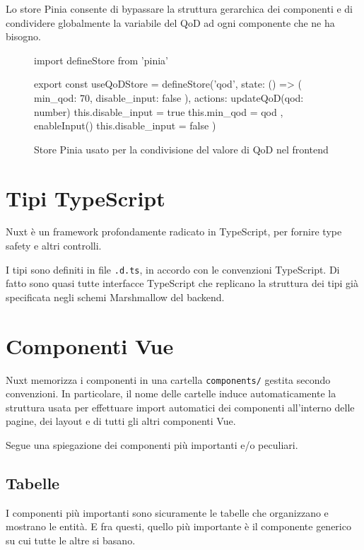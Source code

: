 Lo store Pinia consente di bypassare la struttura gerarchica dei componenti e di condividere globalmente la variabile del QoD ad ogni componente che ne ha bisogno.

\begin{figure}
\centering
\begin{jscode}
import { defineStore } from 'pinia'

export const useQoDStore = defineStore('qod', {
  state: () => ({ min_qod: 70, disable_input: false }),
  actions: {
    updateQoD(qod: number) {
      this.disable_input = true
      this.min_qod = qod
    },
    enableInput() {
      this.disable_input = false
    }
  }
})
\end{jscode}
\caption{Store Pinia usato per la condivisione del valore di QoD nel frontend}
\end{figure}

\section{Tipi TypeScript}
Nuxt è un framework profondamente radicato in TypeScript, per fornire type safety e altri controlli.

I tipi sono definiti in file \texttt{.d.ts}, in accordo con le convenzioni TypeScript. Di fatto sono quasi tutte interfacce TypeScript che replicano la struttura dei tipi già specificata negli schemi Marshmallow del backend.

\section{Componenti Vue}
Nuxt memorizza i componenti in una cartella \texttt{components/} gestita secondo convenzioni. In particolare, il nome delle cartelle induce automaticamente la struttura usata per effettuare import automatici dei componenti all'interno delle pagine, dei layout e di tutti gli altri componenti Vue.

Segue una spiegazione dei componenti più importanti e/o peculiari.

\subsection{Tabelle}
I componenti più importanti sono sicuramente le tabelle che organizzano e mostrano le entità. E fra questi, quello più importante è il componente generico su cui tutte le altre si basano.

